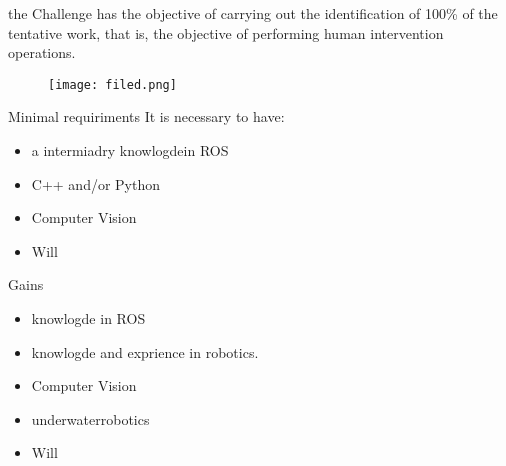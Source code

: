 \begin{frame}{}
    \transdissolve[duration=0.5]
   
    \begin{center}
    \end{center}
\end{frame}



\begin{frame}{}

    the Challenge has the objective of carrying out the identification of 100\% of the tentative work, that is, the objective of performing human intervention operations.
   
    \begin{center}
        \begin{figure}
            \texttt{[image: filed.png]}               
           
        \end{figure}
    
        \end{center}
\end{frame}

\begin{frame}{Minimal requiriments}
    It is necessary to have:
    \begin{itemize}
        \item a intermiadry knowlogdein ROS 
        \item C++ and/or Python
        \item Computer Vision
        \item Will
    \end{itemize} 
   
\end{frame}

\begin{frame}{Gains}
    \begin{itemize}
        \item  knowlogde in ROS 
        \item  knowlogde and exprience in robotics.
        \item Computer Vision
        \item underwaterrobotics
        \item Will
    \end{itemize} 
   
\end{frame}






    
   
